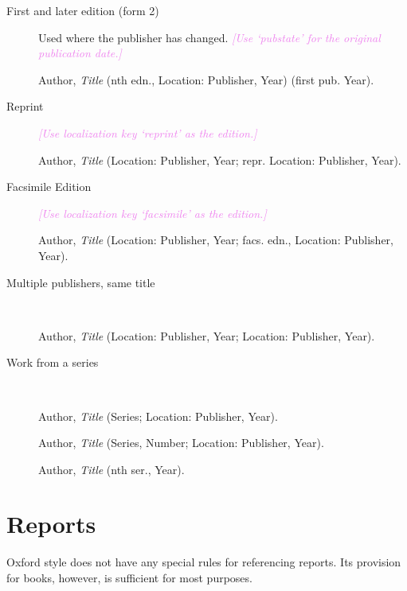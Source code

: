 \documentclass[extrafontsizes,11pt,a4paper,oneside]{memoir}
\newcommand*{\lit}[1]{\textsf{#1}}
\newcommand*{\code}[1]{`\textsf{#1}'}
\newcommand*{\aside}[1]{\textcolor{violet}{\emph{[#1]}}}
\begin{document}
\begin{description}
        \item[First and later edition (form 2)] Used where the publisher has changed. \aside{Use \code{pubstate} for the original publication date.}
        \par Author, \emph{Title} (nth \lit{edn.}, Location: Publisher, Year) (\lit{first pub.} Year).
        \\
        
        \item[Reprint] \aside{Use localization key \code{reprint} as the edition.}\par 
        Author, \emph{Title} (Location: Publisher, Year; \lit{repr.} Location: Publisher, Year).
        \\
        
        \item[Facsimile Edition] \aside{Use localization key \code{facsimile} as the edition.}\par 
        Author, \emph{Title} (Location: Publisher, Year; \lit{facs. edn.}, Location: Publisher, Year).
        \\
        
        \item[Multiple publishers, same title]~\par 
        Author, \emph{Title} (Location: Publisher, Year; Location: Publisher, Year).
        \\
        
        \item[Work from a series]~
        \par Author, \emph{Title} (Series; Location: Publisher, Year).
        \par Author, \emph{Title} (Series, Number; Location: Publisher, Year).
        \\
        \par Author, \emph{Title} (nth \lit{ser.}, Year).
    \end{description}
    
    \section{Reports}\label{sec:report}
    
    Oxford style does not have any special rules for referencing reports. Its provision for books, however, is sufficient for most purposes.
    
\end{document}
